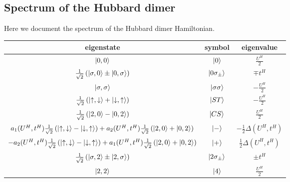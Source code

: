 \documentclass{report}
\numberwithin{equation}{section}
\begin{document}
\begin{appendices}
\section{Spectrum of the Hubbard dimer}
Here we document the spectrum of the Hubbard dimer Hamiltonian.
\begin{center}
	\begin{tabular}{|c|c|c|}
	\hline
	eigenstate & symbol & eigenvalue \\
	\hline
	$\ket{0,0}$ & $\ket{0}$ & \( \frac{U^H}{2}\)\\
	$ \frac{1}{\sqrt 2}\left(\ket{\sigma,0} \pm \ket{0,\sigma}\right)$ & $\ket{0\sigma_\pm}$ & \(\mp t^H\)\\
	$\ket{\sigma,\sigma}$ & $\ket{\sigma\sigma}$ & \( -\frac{U^H}{2}\)\\
	$ \frac{1}{\sqrt 2}\left(\ket{\uparrow,\downarrow} + \ket{\downarrow,\uparrow}\right)$ & $\ket{ST}$ & \( -\frac{U^H}{2}\)\\
	$ \frac{1}{\sqrt 2}\left(\ket{2,0} - \ket{0,2}\right)$ & $\ket{CS}$ & \( \frac{U^H}{2}\)\\
	$a_1(U^H, t^H) \frac{1}{\sqrt 2}\left(\ket{\uparrow,\downarrow} - \ket{\downarrow,\uparrow}\right) + a_2(U^H, t^H)\frac{1}{\sqrt 2}\left(\ket{2,0} + \ket{0,2}\right)$ & $\ket{-}$ & \(-\frac{1}{2}\Delta(U^H, t^H)\)\\
	$-a_2(U^H, t^H) \frac{1}{\sqrt 2}\left(\ket{\uparrow,\downarrow} - \ket{\downarrow,\uparrow}\right) + a_1(U^H, t^H)\frac{1}{\sqrt 2}\left(\ket{2,0} + \ket{0,2}\right)$ & $\ket{+}$ & \(\frac{1}{2}\Delta(U^H, t^H)\)\\
	$ \frac{1}{\sqrt 2}\left(\ket{\sigma,2} \pm \ket{2,\sigma}\right)$ & $\ket{2\sigma_\pm}$ & \(\pm t^H\)\\
	$\ket{2,2}$ & $\ket{4}$ & \( \frac{U^H}{2}\)\\
\hline
	\end{tabular}
	\label{hubb_dim_spectrum}
\end{center}


\end{appendices}
\end{document}
